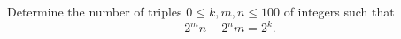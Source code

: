 Determine the number of triples $0 \le k,m,n \le 100$ of integers such that \[ 2^mn - 2^nm = 2^k. \]